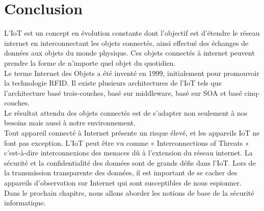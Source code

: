 	\section{Conclusion}
L’IoT est un concept en évolution constante dont l’objectif est d’étendre le réseau internet en interconnectant les objets connectés, ainsi ef{\kern0pt}fectué des échanges de données aux objets du monde physique. Ces objets connectés à internet peuvent prendre la forme de n’importe quel objet du quotidien.\\
Le terme \og Internet des Objets \fg{} a été inventé en 1999, initialement pour promouvoir la technologie RFID. Il existe plusieurs architectures de l’IoT tels que l’architecture basé trois-couches, basé sur middleware, basé sur SOA et basé cinq-couches.\\
Le résultat attendu des objets connectés est de s’adapter non seulement à nos besoins mais aussi à notre environnement.\\
Tout appareil connecté à Internet présente un risque élevé, et les appareils IoT ne font pas exception. L’IoT peut être vu comme « Interconnections of Threats » c’est-à-dire interconnexions des menaces dû à l’extension du réseau internet. La sécurité et la conf{\kern0pt}identialité des données sont de grands déf{\kern0pt}is dans l’IoT. Lors de la transmission transparente des données, il est important de se cacher des appareils d'observation sur Internet qui sont susceptibles de nous espionner.\\
Dans le prochain chapitre, nous allons aborder les notions de base de la sécurité informatique.
	
	